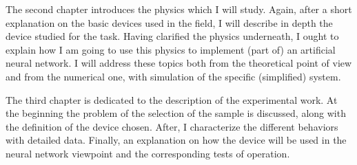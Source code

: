 The second chapter introduces the physics which I will study.
Again, after a short explanation on the basic devices used in the field, I will describe in depth the device studied for the task.
Having clarified the physics underneath, I ought to explain how I am going to use this physics to implement (part of) an artificial neural network.
I will address these topics both from the theoretical point of view and from the numerical one, with simulation of the specific (simplified) system.

The third chapter is dedicated to the description of the experimental work.
At the beginning the problem of the selection of the sample is discussed, along with the definition of the device chosen.
After, I characterize the different behaviors with detailed data.
Finally, an explanation on how the device will be used in the neural network viewpoint and the corresponding tests of operation.